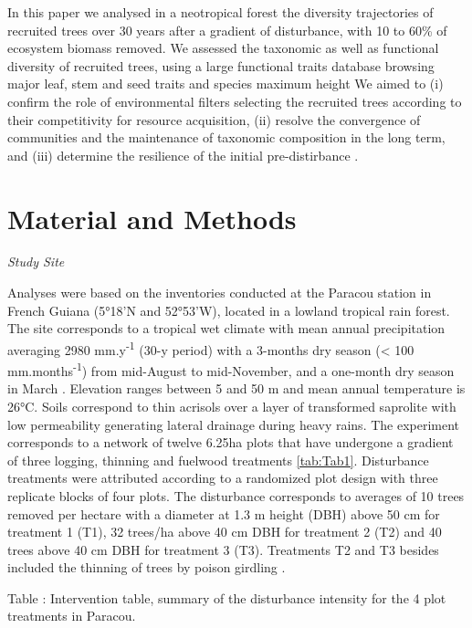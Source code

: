 \documentclass[fleqn,10pt]{ArtEcoFoG} %
\begin{document}
In this paper we analysed in a neotropical forest the diversity
trajectories of recruited trees over 30 years after a gradient of
disturbance, with 10 to 60\% of ecosystem biomass removed. We assessed
the taxonomic as well as functional diversity of recruited trees, using
a large functional traits database browsing major leaf, stem and seed
traits and species maximum height We aimed to (i) confirm the role of
environmental filters selecting the recruited trees according to their
competitivity for resource acquisition, (ii) resolve the convergence of
communities and the maintenance of taxonomic composition in the long
term, and (iii) determine the resilience of the initial pre-distirbance
.

\section{Material and Methods}\label{material-and-methods}

\emph{Study Site}

Analyses were based on the inventories conducted at the Paracou station
in French Guiana (5°18'N and 52°53'W), located in a lowland tropical
rain forest. The site corresponds to a tropical wet climate with mean
annual precipitation averaging 2980 mm.y\textsuperscript{-1} (30-y
period) with a 3-months dry season (\textless{} 100
mm.months\textsuperscript{-1}) from mid-August to mid-November, and a
one-month dry season in March \citep{Wagner2011}. Elevation ranges
between 5 and 50 m and mean annual temperature is 26°C. Soils correspond
to thin acrisols over a layer of transformed saprolite with low
permeability generating lateral drainage during heavy rains. The
experiment corresponds to a network of twelve 6.25ha plots that have
undergone a gradient of three logging, thinning and fuelwood treatments
\ref{tab:Tab1}. Disturbance treatments were attributed according to a
randomized plot design with three replicate blocks of four plots. The
disturbance corresponds to averages of 10 trees removed per hectare with
a diameter at 1.3 m height (DBH) above 50 cm for treatment 1 (T1), 32
trees/ha above 40 cm DBH for treatment 2 (T2) and 40 trees above 40 cm
DBH for treatment 3 (T3). Treatments T2 and T3 besides included the
thinning of trees by poison girdling \citep{Blanc2009}.

Table : \label{tab:Tab1} Intervention table, summary of the disturbance
intensity for the 4 plot treatments in Paracou.
\end{document}

